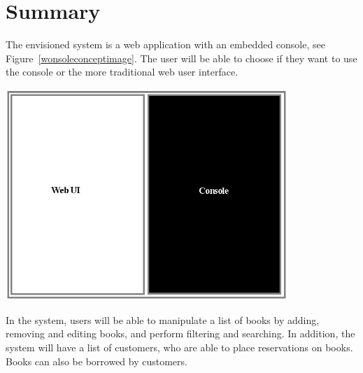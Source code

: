 \section{Summary}

The envisioned system is a web application with an embedded console, see Figure~\ref{wonsoleconceptimage}. The user will be able to choose if they want to use the console or the more traditional web user interface.

\begin{center}
\includegraphics[width = 0.8\textwidth]{image/wonsole-concept.png}
\label{wonsoleconceptimage}%
\end{center}

In the system, users will be able to manipulate a list of books by adding, removing and editing books, and perform filtering and searching. In addition, the system will have a list of customers, who are able to place reservations on books. Books can also be borrowed by customers. 